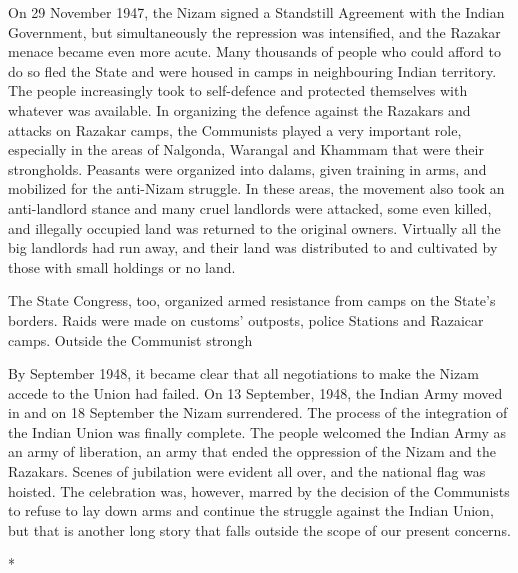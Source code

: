 On 29 November 1947, the Nizam signed a Standstill Agreement with the Indian Government, but simultaneously the repression was intensified, and the Razakar menace became even more acute. Many thousands of people who could afford to do so fled the State and were housed in camps in neighbouring Indian territory. The people increasingly took to self-defence and protected themselves with whatever was available. In organizing the defence against the Razakars and attacks on Razakar camps, the Communists played a very important role, especially in the areas of Nalgonda, Warangal and Khammam that were their strongholds. Peasants were organized into dalams, given training in arms, and mobilized for the anti-Nizam struggle. In these areas, the movement also took an anti-landlord stance and many cruel landlords were attacked, some even killed, and illegally occupied land was returned to the original owners. Virtually all the big landlords had run away, and their land was distributed to and cultivated by those with small holdings or no land. 

The State Congress, too, organized armed resistance from camps on the State’s borders. Raids were made on customs’ outposts, police Stations and Razaicar camps. Outside the Communist strongh%

By September 1948, it became clear that all negotiations to make the Nizam accede to the Union had failed. On 13 September, 1948, the Indian Army moved in and on 18 September the Nizam surrendered. The process of the integration of the Indian Union was finally complete. The people welcomed the Indian Army as an army of liberation, an army that ended the oppression of the Nizam and the Razakars. Scenes of jubilation were evident all over, and the national flag was hoisted. The celebration was, however, marred by the decision of the Communists to refuse to lay down arms and continue the struggle against the Indian Union, but that is another long story that falls outside the scope of our present concerns.

\begin{center}*\end{center}



